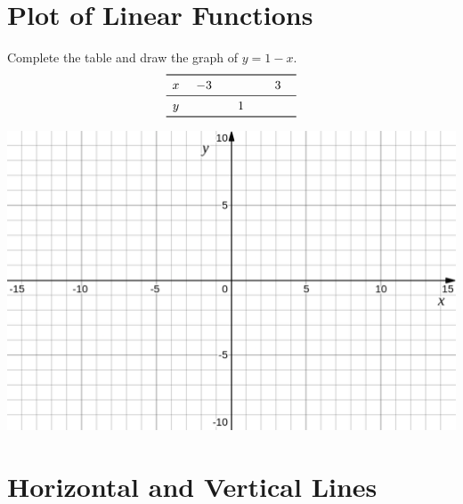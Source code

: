 \documentclass[a4paper,12pt]{article}
\begin{document}
\section{Plot of Linear Functions}
Complete the table and draw the graph of \(y=1-x\).
\[\begin{array}{cccc}
    \toprule
    x&-3&\quad\quad&3\\
    \midrule
    y&\quad\quad&1&\quad\quad\\
    \bottomrule
\end{array}\]
\begin{center}
\includegraphics[width=.99\textwidth]{catesian.png}
\end{center}
\newpage
\section{Horizontal and Vertical Lines}
\end{document}
